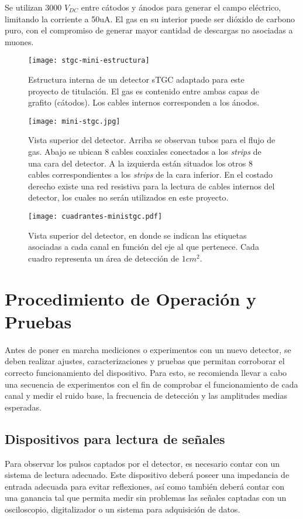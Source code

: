 	Se utilizan 3000 $V_{DC}$ entre cátodos y ánodos para generar el campo eléctrico, limitando la corriente a 50uA. El gas en su interior puede ser dióxido de carbono puro, con el compromiso de generar mayor cantidad de descargas no asociadas a muones.
	
	\begin{figure}[h]
		\centering
		\texttt{[image: stgc-mini-estructura]}
		\caption{Estructura interna de un detector sTGC adaptado para este proyecto de titulación. El gas es contenido entre ambas capas de grafito (cátodos). Los cables internos corresponden a los ánodos.}
		\label{img:stgc-mini-estructura}
	\end{figure}

\newpage
	\begin{figure}[h]
		\centering
		\texttt{[image: mini-stgc.jpg]}
		\caption{Vista superior del detector. Arriba se observan tubos para el flujo de gas. Abajo se ubican 8 cables coaxiales conectados a los \textit{strips} de una cara del detector. A la izquierda están situados los otros 8 cables correspondientes a los \textit{strips} de la cara inferior. En el costado derecho existe una red resistiva para la lectura de cables internos del detector, los cuales no serán utilizados en este proyecto.}
		\label{img:foto-mini-stgc}
	\end{figure}

	\begin{figure}[h]
		\centering
		\texttt{[image: cuadrantes-ministgc.pdf]}
		\caption{Vista superior del detector, en donde se indican las etiquetas asociadas a cada canal en función del eje al que pertenece. Cada cuadro representa un área de detección de $1cm^2$.}
		\label{img:cuadrantes-ministgc}
	\end{figure}

\newpage
\section{Procedimiento de Operación y Pruebas}
	Antes de poner en marcha mediciones o experimentos con un nuevo detector, se deben realizar ajustes, caracterizaciones y pruebas que permitan corroborar el correcto funcionamiento del dispositivo. Para esto, se recomienda llevar a cabo una secuencia de experimentos con el fin de comprobar el funcionamiento de cada canal y medir el ruido base, la frecuencia de detección y las amplitudes medias esperadas.

	\subsection{Dispositivos para lectura de señales}
		Para observar los pulsos captados por el detector, es necesario contar con un sistema de lectura adecuado. Este dispositivo deberá poseer una impedancia de entrada adecuada para evitar reflexiones, así como también deberá contar con una ganancia tal que permita medir sin problemas las señales captadas con un osciloscopio, digitalizador o un sistema para adquisición de datos.
		
